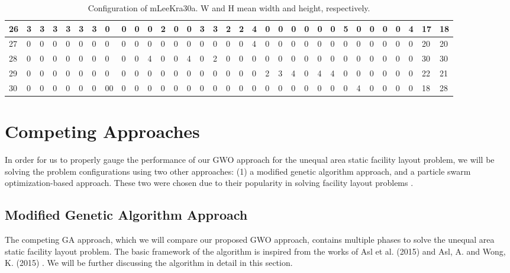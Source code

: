\begin{table}[h!]
\begin{adjustwidth}{0.3in}{}
{{\begin{tabular}{l|l|l|l|l|l|l|l|l|l|l|l|l|l|l|l|l|l|l|l|l|l|l|l|l|l|l|l|l|l|l|l|l|}
	\hline
	\multicolumn{1}{|l|}{26}                                    & 3 & 3 & 3 & 3 & 3 & 3 & 0  & 0 & 0 & 0  & 2  & 0  & 0  & 3  & 3  & 2  & 2  & 4  & 0  & 0  & 0  & 0  & 0  & 0  & 5  & 0  & 0  & 0  & 0  & 4  & 17                 & 18                  \\ 
	\hline
	\multicolumn{1}{|l|}{27}                                    & 0 & 0 & 0 & 0 & 0 & 0 & 0  & 0 & 0 & 0  & 0  & 0  & 0  & 0  & 0  & 0  & 0  & 4  & 0  & 0  & 0  & 0  & 0  & 0  & 0  & 0  & 0  & 0  & 0  & 0  & 20                 & 20                  \\ 
	\hline
	\multicolumn{1}{|l|}{28}                                    & 0 & 0 & 0 & 0 & 0 & 0 & 0  & 0 & 0 & 4  & 0  & 0  & 4  & 0  & 2  & 0  & 0  & 0  & 0  & 0  & 0  & 0  & 0  & 0  & 0  & 0  & 0  & 0  & 0  & 0  & 30                 & 30                  \\ 
	\hline
	\multicolumn{1}{|l|}{29}                                    & 0 & 0 & 0 & 0 & 0 & 0 & 0  & 0 & 0 & 0  & 0  & 0  & 0  & 0  & 0  & 0  & 0  & 0  & 2  & 3  & 4  & 0  & 4  & 4  & 0  & 0  & 0  & 0  & 0  & 0  & 22                 & 21                  \\ 
	\hline
	\multicolumn{1}{|l|}{30}                                    & 0 & 0 & 0 & 0 & 0 & 0 & 00 & 0 & 0 & 0  & 0  & 0  & 0  & 0  & 0  & 0  & 0  & 0  & 0  & 0  & 0  & 0  & 0  & 0  & 0  & 4  & 0  & 0  & 0  & 0  & 18                 & 28                  \\
	\hline
\end{tabular}}}
\end{adjustwidth}
\caption{Configuration of mLeeKra30a. W and H mean width and height, respectively.}
\label{dataset-mleekra30a}
\end{table}

\section{Competing Approaches}
In order for us to properly gauge the performance of our GWO approach for the unequal area static facility layout problem, we will be solving the problem configurations using two other approaches: (1) a modified genetic algorithm approach, and a particle swarm optimization-based approach. These two were chosen due to their popularity in solving facility layout problems \cite{Hosseini-Nasab2018}.

\subsection{Modified Genetic Algorithm Approach}
The competing GA approach, which we will compare our proposed GWO approach, contains multiple phases to solve the unequal area static facility layout problem. The basic framework of the algorithm is inspired from the works of Asl et al. (2015) \cite{Asl2015} and Asl, A. and Wong, K. (2015) \cite{Asl2015a}. We will be further discussing the algorithm in detail in this section.

